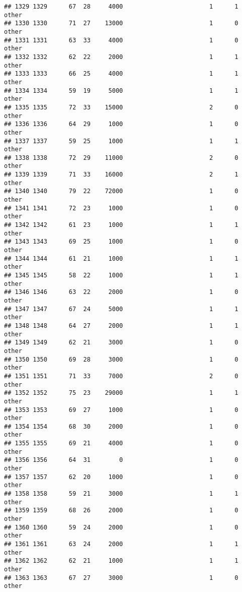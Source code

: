 \documentclass[
]{article}
\begin{document}
\begin{verbatim}
## 1329 1329      67  28     4000                        1      1    other
## 1330 1330      71  27    13000                        1      0    other
## 1331 1331      63  33     4000                        1      0    other
## 1332 1332      62  22     2000                        1      1    other
## 1333 1333      66  25     4000                        1      1    other
## 1334 1334      59  19     5000                        1      1    other
## 1335 1335      72  33    15000                        2      0    other
## 1336 1336      64  29     1000                        1      0    other
## 1337 1337      59  25     1000                        1      1    other
## 1338 1338      72  29    11000                        2      0    other
## 1339 1339      71  33    16000                        2      1    other
## 1340 1340      79  22    72000                        1      0    other
## 1341 1341      72  23     1000                        1      0    other
## 1342 1342      61  23     1000                        1      1    other
## 1343 1343      69  25     1000                        1      0    other
## 1344 1344      61  21     1000                        1      1    other
## 1345 1345      58  22     1000                        1      1    other
## 1346 1346      63  22     2000                        1      0    other
## 1347 1347      67  24     5000                        1      1    other
## 1348 1348      64  27     2000                        1      1    other
## 1349 1349      62  21     3000                        1      0    other
## 1350 1350      69  28     3000                        1      0    other
## 1351 1351      71  33     7000                        2      0    other
## 1352 1352      75  23    29000                        1      1    other
## 1353 1353      69  27     1000                        1      0    other
## 1354 1354      68  30     2000                        1      0    other
## 1355 1355      69  21     4000                        1      0    other
## 1356 1356      64  31        0                        1      0    other
## 1357 1357      62  20     1000                        1      0    other
## 1358 1358      59  21     3000                        1      1    other
## 1359 1359      68  26     2000                        1      0    other
## 1360 1360      59  24     2000                        1      0    other
## 1361 1361      63  24     2000                        1      1    other
## 1362 1362      62  21     1000                        1      1    other
## 1363 1363      67  27     3000                        1      0    other

\end{verbatim}
\end{document}
